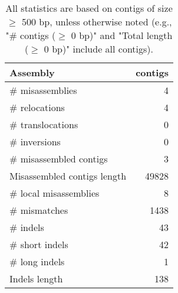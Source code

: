 \documentclass[12pt,a4paper]{article}
\begin{document}
\begin{table}[ht]
\begin{center}
\caption{All statistics are based on contigs of size $\geq$ 500 bp, unless otherwise noted (e.g., "\# contigs ($\geq$ 0 bp)" and "Total length ($\geq$ 0 bp)" include all contigs).}
\begin{tabular}{|l*{1}{|r}|}
\hline
Assembly & contigs \\ \hline
\# misassemblies & 4 \\ \hline
\hspace{5mm}\# relocations & 4 \\ \hline
\hspace{5mm}\# translocations & 0 \\ \hline
\hspace{5mm}\# inversions & 0 \\ \hline
\# misassembled contigs & 3 \\ \hline
Misassembled contigs length & 49828 \\ \hline
\# local misassemblies & 8 \\ \hline
\# mismatches & 1438 \\ \hline
\# indels & 43 \\ \hline
\hspace{5mm}\# short indels & 42 \\ \hline
\hspace{5mm}\# long indels & 1 \\ \hline
Indels length & 138 \\ \hline
\end{tabular}
\end{center}
\end{table}
\end{document}
